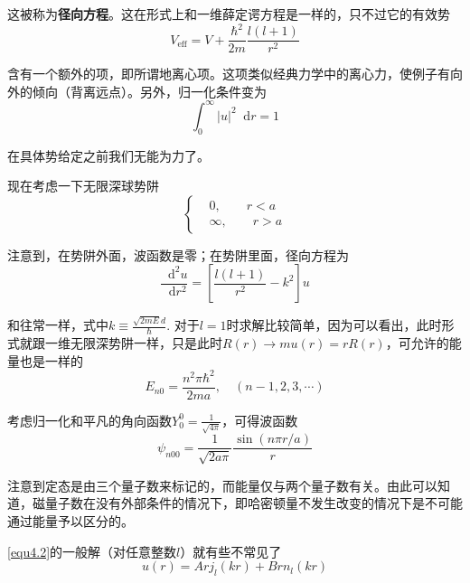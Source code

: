 \documentclass[UTF8]{ctexart}
\begin{document}
\noindent 这被称为\textbf{径向方程}。这在形式上和一维薛定谔方程是一样的，只不过它的有效势
\begin{equation}
    V_{\text{eff}} = V + \frac{\hbar^2}{2m}\frac{l(l+1)}{r^2}
\end{equation}

\noindent 含有一个额外的项，即所谓地离心项。这项类似经典力学中的离心力，使例子有向外的倾向（背离远点）。另外，归一化条件变为
\begin{equation}
    \int_{0}^{\infty} |u|^2 \mathop{}\!\mathrm{d}  r = 1
\end{equation}

\noindent 在具体势给定之前我们无能为力了。

    现在考虑一下无限深球势阱
    \begin{equation}
        \left \{ \begin{aligned}
            &0, \qquad r<a \\
            &\infty, \qquad r>a
        \end{aligned} \right.
    \end{equation}

    注意到，在势阱外面，波函数是零；在势阱里面，径向方程为
    \begin{equation}
        \frac{\mathop{}\!\mathrm{d}^2 u}{\mathop{}\!\mathrm{d} r^2} = \left[\frac{l(l+1)}{r^2} - k^2 \right]u \label{equ4.2}
    \end{equation}

\noindent 和往常一样，式中$k \equiv \frac{\sqrt{2 m E}d}{\hbar}$. 对于$l=1$时求解比较简单，因为可以看出，此时形式就跟一维无限深势阱一样，只是此时$R(r) \to mu(r)=rR(r)$，可允许的能量也是一样的
\begin{equation}
    E_{n0} = \frac{n^2 \pi \hbar^2}{2m a}, \quad (n-1,2,3,\cdots)
\end{equation}

\noindent 考虑归一化和平凡的角向函数$Y_0^0 = \frac{1}{\sqrt{4 \pi}}$，可得波函数
\begin{equation}
    \psi_{n00} =  \frac{1}{\sqrt{2 a \pi}} \frac{\sin (n \pi r /a)}{r}
\end{equation}

\noindent 注意到定态是由三个量子数来标记的，而能量仅与两个量子数有关。由此可以知道，磁量子数在没有外部条件的情况下，即哈密顿量不发生改变的情况下是不可能通过能量予以区分的。

    \autoref{equ4.2}的一般解（对任意整数$l$）就有些不常见了
    \begin{equation}
        u(r) = Arj_l(kr) + Brn_l(kr)
    \end{equation}
\end{document}
